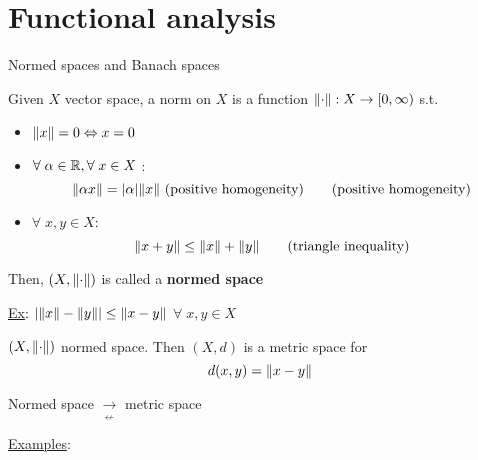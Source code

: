\section*{Functional analysis}
Normed spaces and Banach spaces
\begin{definition}
    Given \(X\) vector space, a norm on \(X\) is a function \(\norm{\cdot} : X \to [0, \infty)\) s.t.
    \begin{itemize}
        \item \(\norm{x} = 0 \Leftrightarrow x = 0\)
        \item \(\forall \; \alpha \in \mathbb{R}, \forall \; x \in X\) : 
        \[
            \norm{\alpha x} = \abs{\alpha}\norm{x} \text{ (positive homogeneity)} \tag*{(positive homogeneity)}
        \]
        \item \(\forall \; x,y \in X\): 
        \[
            \norm{x+y} \leq \norm{x} + \norm{y} \tag*{(triangle inequality)}
        \]
    \end{itemize}
    Then, \((X, \norm{\cdot})\) is called a \textbf{normed space}
\end{definition}
\noindent\underline{Ex}: \(\abs{\norm{x} - \norm{y}} \leq \norm{x - y}\) \(\forall \; x,y \in X\)
\begin{proposition}
    \((X, \norm{\cdot})\) normed space. Then \((X, d)\) is a metric space for 
    \[
        d(x,y) = \norm{x - y}
    \]
\end{proposition}
\begin{remark}
    Normed space \(\underset{\displaystyle\nleftarrow}{\rightarrow}\) metric space
\end{remark}
\noindent\underline{Examples}:

